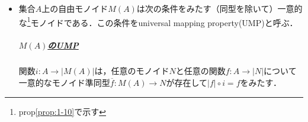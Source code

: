 \documentclass[dvipdfmx,a4j,10pt]{jsarticle}
\theoremstyle{mystyle1}
\theoremstyle{mystyle2}
\newcommand{\Sets}{\mathbf{Sets}}
\newcommand{\Mon}{\mathbf{Mon}}
\begin{document}
\begin{itemize}
{			      この関手自体がモノイド準同型．


		      }これは"\textbf{忘却関手（forget functor）}"と呼ばれる．
		\item 集合$A$上の自由モノイド$M(A)$は次の条件をみたす（同型を除いて）一意的な\footnote{prop\ref{prop:1-10}で示す}モノイドである．この条件をuniversal mapping property(UMP)と呼ぶ．
		      \subparagraph{\underline{$M(A)$のUMP}}
		      関数$i:A\to|M(A)|$は，任意のモノイド$N$と任意の関数$f:A\to|N|$について一意的なモノイド準同型$\overline{f}:M(A)\to N$が存在して$|f|\circ i=f$をみたす．


\end{itemize}
\end{document}
